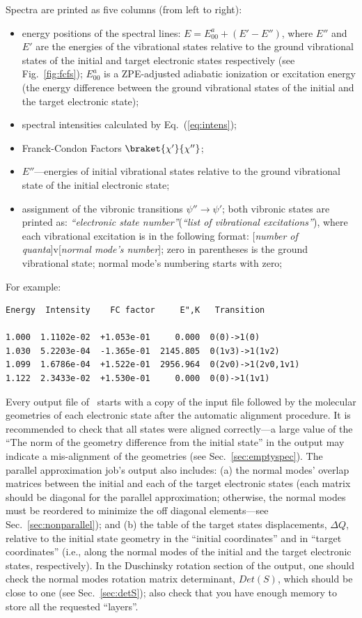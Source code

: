 \documentclass[11pt]{article}
\begin{document}
Spectra are printed as five columns (from left to right):
\begin{itemize}
\item energy positions of the spectral lines: $E=E^a_{00}+(E'-E'')$, where $E''$ and $E'$ are the energies
of the vibrational states relative to the ground vibrational states of the initial and target
electronic states respectively (see Fig.~\ref{fig:fcfs}); 
$E^a_{00}$ is a ZPE-adjusted adiabatic ionization or excitation energy 
(the energy difference between the ground vibrational states of the initial and the target electronic state);
\item spectral intensities calculated by Eq.~(\ref{eq:intens});
\item Franck-Condon Factors $\braket{\chi '}{\chi''}$;
\item $E''$---energies of initial vibrational states relative to the ground vibrational state 
of the initial electronic state;
\item assignment of the vibronic transitions $\psi''\to\psi '$; both vibronic states are
printed as: {\em ``electronic state number''}({\em``list of vibrational excitations''}), 
where each vibrational excitation is in the following format: [{\em number of quanta}]v[{\em normal mode's number}];
zero in parentheses is the ground vibrational state; normal mode's numbering starts with zero;
\end{itemize}

For example:
\begin{lstlisting}[frame=single,framerule=0pt]
Energy  Intensity    FC factor     E",K   Transition

1.000  1.1102e-02  +1.053e-01     0.000  0(0)->1(0)
1.030  5.2203e-04  -1.365e-01  2145.805  0(1v3)->1(1v2)
1.099  1.6786e-04  +1.522e-01  2956.964  0(2v0)->1(2v0,1v1)
1.122  2.3433e-02  +1.530e-01     0.000  0(0)->1(1v1)
\end{lstlisting}

Every output file of \ezFCF\
starts with a copy of the input \xml file followed by the 
molecular geometries of each electronic state after the automatic alignment procedure. 
It is recommended to check that all states were aligned correctly---a large 
value of the ``The norm of the geometry difference from the initial state'' in the output
may indicate a mis-alignment of the geometries (see Sec.~\ref{sec:emptyspec}).
The parallel approximation job's output also includes: 
(a) the normal modes' overlap matrices between the initial and each of the
target electronic states (each matrix should be diagonal for the parallel approximation;
otherwise, the normal modes must be reordered to minimize the off diagonal elements---see 
Sec.~\ref{sec:nonparallel});
and (b) the table of the target states displacements, 
$\Delta Q$, relative to the initial state geometry in the ``initial coordinates''
and in ``target coordinates'' (i.e., along the normal modes of the initial and the target electronic states, respectively).
In the Duschinsky rotation section of the output, one should check the normal modes rotation matrix determinant,
$Det(S)$, which should be close to one (see Sec.~\ref{sec:detS}); also check that you have enough
memory to store all the requested ``layers''. 
\end{document}
